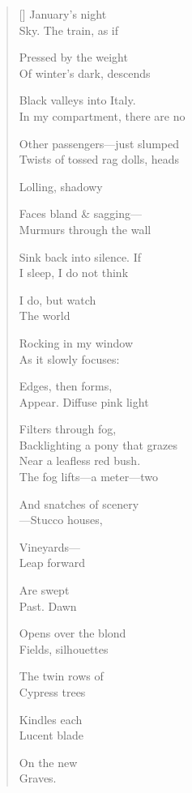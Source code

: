\begin{verse}[\versewidth]
January's night\\
Sky. The train, as if

Pressed by the weight\\
Of winter's dark, descends

Black valleys into Italy.\\
In my compartment, there are no

Other passengers---just slumped\\
Twists of tossed rag dolls, heads

Lolling, shadowy

Faces bland \& sagging---\\
Murmurs through the wall

Sink back into silence.    If\\
I sleep, I do not think

I do, but watch\\
The world

Rocking in my window\\
As it slowly focuses:

Edges, then forms,\\
Appear. Diffuse pink light

Filters through fog,\\
Backlighting a pony that grazes\\

Near a leafless red bush.\\
The fog lifts---a meter---two

And snatches of scenery\\
---Stucco houses,

Vineyards---\\
Leap forward

Are swept\\
Past.      Dawn

Opens over the blond\\
Fields, silhouettes

The twin rows of\\
Cypress trees

Kindles each\\
Lucent blade

On the new\\
Graves.
\end{verse}
